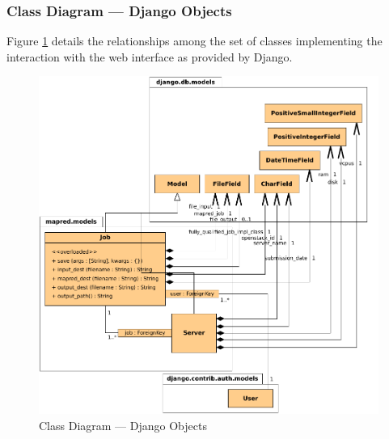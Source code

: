 \subsubsection{Class Diagram --- Django Objects}\label{subsubsec:clasesobjetosdjango}
\noindent Figure \ref{fig:clasesobjetosdjango} details the relationships among the set of classes implementing the interaction with the web interface as provided by Django.

\begin{figure}[tbp]
\begin{center}
\includegraphics[width=0.99\textwidth]{imagenes/030.pdf}
 \caption{Class Diagram --- Django Objects}
\label{fig:clasesobjetosdjango}
\end{center}
\end{figure}

